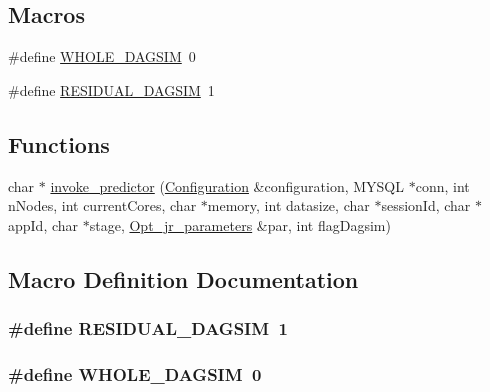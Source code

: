 \subsection*{Macros}
\begin{DoxyCompactItemize}
\item 
\#define \hyperlink{invoke__predictor_8hh_a3806de5f70b6971cfe8be82520f4bf2a}{W\-H\-O\-L\-E\-\_\-\-D\-A\-G\-S\-I\-M}~0
\item 
\#define \hyperlink{invoke__predictor_8hh_a016c9fba38e790ceafd4d9843f2dc564}{R\-E\-S\-I\-D\-U\-A\-L\-\_\-\-D\-A\-G\-S\-I\-M}~1
\end{DoxyCompactItemize}
\subsection*{Functions}
\begin{DoxyCompactItemize}
\item 
char $\ast$ \hyperlink{invoke__predictor_8hh_a08c78503a3848b016487ab7d31fd9074}{invoke\-\_\-predictor} (\hyperlink{classConfiguration}{Configuration} \&configuration, M\-Y\-S\-Q\-L $\ast$conn, int n\-Nodes, int current\-Cores, char $\ast$memory, int datasize, char $\ast$session\-Id, char $\ast$app\-Id, char $\ast$stage, \hyperlink{classOpt__jr__parameters}{Opt\-\_\-jr\-\_\-parameters} \&par, int flag\-Dagsim)
\end{DoxyCompactItemize}


\subsection{Macro Definition Documentation}
\hypertarget{invoke__predictor_8hh_a016c9fba38e790ceafd4d9843f2dc564}{
\subsubsection[{R\-E\-S\-I\-D\-U\-A\-L\-\_\-\-D\-A\-G\-S\-I\-M}]{\setlength{\rightskip}{0pt plus 5cm}\#define R\-E\-S\-I\-D\-U\-A\-L\-\_\-\-D\-A\-G\-S\-I\-M~1}}\label{invoke__predictor_8hh_a016c9fba38e790ceafd4d9843f2dc564}
\hypertarget{invoke__predictor_8hh_a3806de5f70b6971cfe8be82520f4bf2a}{
\subsubsection[{W\-H\-O\-L\-E\-\_\-\-D\-A\-G\-S\-I\-M}]{\setlength{\rightskip}{0pt plus 5cm}\#define W\-H\-O\-L\-E\-\_\-\-D\-A\-G\-S\-I\-M~0}}\label{invoke__predictor_8hh_a3806de5f70b6971cfe8be82520f4bf2a}



